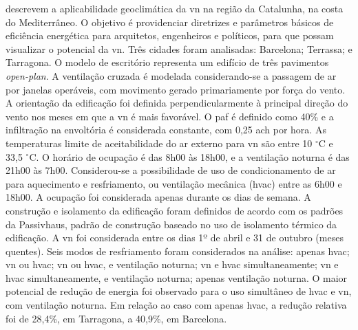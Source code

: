  descrevem a aplicabilidade geoclimática da \acrshort{vn} na região da Catalunha, na costa do Mediterrâneo. O objetivo é providenciar diretrizes e parâmetros básicos de eficiência energética para arquitetos, engenheiros e políticos, para que possam visualizar o potencial da \acrshort{vn}. Três cidades foram analisadas: Barcelona; Terrassa; e Tarragona. O modelo de escritório representa um edifício de três pavimentos \textit{open-plan}. A ventilação cruzada é modelada considerando-se a passagem de ar por janelas operáveis, com movimento gerado primariamente por força do vento. A orientação da edificação foi definida perpendicularmente à principal direção do vento nos meses em que a \acrshort{vn} é mais favorável. O \acrshort{paf} é definido como 40\% e a infiltração na envoltória é considerada constante, com 0,25 \acrfull{ach} por hora. As temperaturas limite de aceitabilidade do ar externo para \acrshort{vn} são entre 10 $^{\circ}$C e 33,5 $^{\circ}$C. O horário de ocupação é das 8h00 às 18h00, e a ventilação noturna é das 21h00 às 7h00. Considerou-se a possibilidade de uso de condicionamento de ar para aquecimento e resfriamento, ou ventilação mecânica (\acrshort{hvac}) entre as 6h00 e 18h00. A ocupação foi considerada apenas durante os dias de semana. A construção e isolamento da edificação foram definidos de acordo com os padrões da Passivhaus, padrão de construção baseado no uso de isolamento térmico da edificação. A \acrshort{vn} foi considerada entre os dias 1º de abril e 31 de outubro (meses quentes). Seis modos de resfriamento foram considerados na análise: apenas \acrshort{hvac}; \acrshort{vn} ou \acrshort{hvac}; \acrshort{vn} ou \acrshort{hvac}, e ventilação noturna; \acrshort{vn} e \acrshort{hvac} simultaneamente; \acrshort{vn} e \acrshort{hvac} simultaneamente, e ventilação noturna; apenas ventilação noturna. O maior potencial de redução de energia foi observado para o uso simultâneo de \acrshort{hvac} e \acrshort{vn}, com ventilação noturna. Em relação ao caso com apenas \acrshort{hvac}, a redução relativa foi de 28,4\%, em Tarragona, a 40,9\%, em Barcelona.

